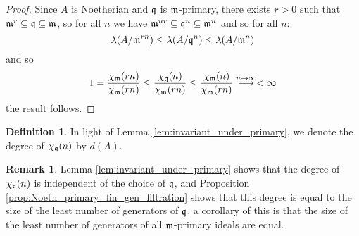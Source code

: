 \documentclass[12pt]{article}
\theoremstyle{plain}
\theoremstyle{definition}
\newtheorem{defn}[thm]{Definition} %
\newtheorem{remark}[thm]{Remark}
\newcommand{\lto}{\longrightarrow}
\begin{document}
	\begin{proof}
		Since $A$ is Noetherian and $\frak{q}$ is $\frak{m}$-primary, there exists $r > 0$ such that $\frak{m}^r \subseteq \frak{q} \subseteq \frak{m}$, so for all $n$ we have $\frak{m}^{nr} \subseteq \frak{q}^n \subseteq \frak{m}^n$ and so for all $n$:
		\[\lambda(A/\frak{m}^{rn}) \leq \lambda(A/\frak{q}^n) \leq \lambda(A/\frak{m}^n)\]
		and so
		\[1 = \frac{\chi_{\frak{m}}(rn)}{\chi_{\frak{m}}(rn)} \leq \frac{\chi_\frak{q}(n)}{\chi_\frak{m}(rn)} \leq \frac{\chi_{\frak{m}}(n)}{\chi_\frak{m}(rn)}\stackrel{n \to \infty}{\lto} < \infty\]
		the result follows.
	\end{proof}
	\begin{defn}
		\label{def:polynomial_degree} In light of Lemma \ref{lem:invariant_under_primary}, we denote the degree of $\chi_\frak{q}(n)$ by $d(A)$.
	\end{defn}
	\begin{remark}
		Lemma \ref{lem:invariant_under_primary} shows that the degree of $\chi_\frak{q}(n)$ is independent of the choice of $\frak{q}$, and Proposition \ref{prop:Noeth_primary_fin_gen_filtration} shows that this degree is equal to the size of the least number of generators of $\frak{q}$, a corollary of this is that the size of the least number of generators of all $\frak{m}$-primary ideals are equal.
	\end{remark}
	
\end{document}
